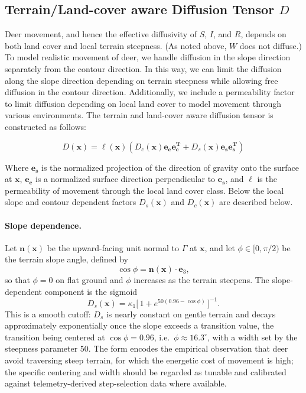 \documentclass[11pt]{article}
\begin{document}
\subsection{Terrain/Land-cover aware Diffusion Tensor \texorpdfstring{$D$}{D}}
\label{sec:diffusion}

Deer movement, and hence the effective diffusivity of $S$, $I$, and $R$, depends on both land cover and local terrain steepness. (As noted above, $W$ does not diffuse.) To model realistic movement of deer, we handle diffusion in the slope direction separately from the contour direction. In this way, we can limit the diffusion along the slope direction depending on terrain steepness while allowing free diffusion in the contour direction. Additionally, we include a permeability factor to limit diffusion depending on local land cover to model movement through various environments. The terrain and land-cover aware diffusion tensor is constructed as follows:

\begin{equation}
  D(\mathbf{x}) = \ell(\mathbf{x})(D_c(\mathbf{x})\mathbf{e_{c}e_{c}^T} + D_s(\mathbf{x})\mathbf{e_{s}e_{s}^T})
  \label{eq:D}
\end{equation}

Where $\mathbf{e_s}$ is the normalized projection of the direction of gravity onto the surface at $\mathbf{x}$, $\mathbf{e_c}$ is a normalized surface direction perpendicular to $\mathbf{e_s}$, and $\ell$ is the permeability of movement through the local land cover class. Below the local slope and contour dependent factors $D_s(\mathbf{x})$ and $D_c(\mathbf{x})$ are described below.

\paragraph{Slope dependence.}
Let $\mathbf{n}(\mathbf{x})$ be the upward-facing unit normal to $\Gamma$ at $\mathbf{x}$, and let $\phi \in [0,\pi/2)$ be the terrain slope angle, defined by
\begin{equation}
  \cos\phi = \mathbf{n}(\mathbf{x})\cdot\mathbf{e}_3,
\end{equation}
so that $\phi = 0$ on flat ground and $\phi$ increases as the terrain steepens. The slope-dependent component is the sigmoid
\begin{equation}
  D_s(\mathbf{x}) = \kappa_1 \big[\,1 + e^{50(0.96 - \cos\phi)}\,\big]^{-1}.
  \label{eq:Ds}
\end{equation}
This is a smooth cutoff: $D_s$ is nearly constant on gentle terrain and decays approximately exponentially once the slope exceeds a transition value, the transition being centered at $\cos\phi = 0.96$, i.e.\ $\phi \approx 16.3^\circ$, with a width set by the steepness parameter $50$. The form encodes the empirical observation that deer avoid traversing steep terrain, for which the energetic cost of movement is high; the specific centering and width should be regarded as tunable and calibrated against telemetry-derived step-selection data where available.
\end{document}
